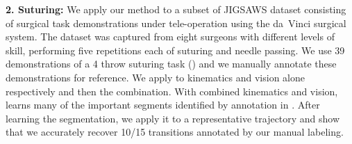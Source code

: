 \documentclass[0-main.tex]{subfiles}
\begin{document}

\vspace{0.25em}
\noindent\textbf{2. Suturing: } 
We apply our method to a subset of JIGSAWS dataset\cite{gao2014jigsaws} consisting of surgical task demonstrations under tele-operation using the da~Vinci surgical system. The dataset was captured from eight surgeons with different levels of skill, performing five repetitions each of suturing and needle passing.
We use 39 demonstrations of a 4 throw suturing task () and we manually annotate these demonstrations for reference.
We apply \tsc to kinematics and vision alone respectively and then the combination.
With combined kinematics and vision, \tsc learns many of the important segments identified by annotation in \cite{gao2014jigsaws}.
After learning the segmentation, we apply it to a representative trajectory and show that we accurately recover 10/15 transitions annotated by our manual labeling.
\end{document}
